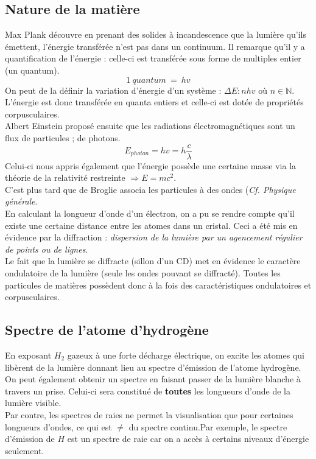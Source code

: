 \documentclass[12pt, a4paper]{article}
\begin{document}
\subsection{Nature de la matière}
Max Plank découvre en prenant des solides à incandescence que la lumière qu'ils émettent, l'énergie transférée n'est pas dans un continuum. Il remarque qu'il y a quantification de l'énergie : celle-ci est transférée sous forme de multiples entier (un quantum).
$$1\ quantum\ =\ hv$$
On peut de la définir la variation d'énergie d'un système : $\Delta E : n h v$ où $n \in \mathbb{N}$. L'énergie est donc transférée en quanta entiers et celle-ci est dotée de propriétés corpusculaires.\\

Albert Einstein proposé ensuite que les radiations électromagnétiques sont un flux de particules ; de photons.
$$E_{photon} = h v = h\frac{c}{\lambda}$$
Celui-ci nous appris également que l'énergie possède une certaine masse via la théorie de la relativité restreinte $\Rightarrow E = mc^2$.\\

C'est plus tard que de Broglie associa les particules à des ondes (\textit{Cf. Physique générale}.\\
En calculant la longueur d'onde d'un électron, on a pu se rendre compte qu'il existe une certaine distance entre les atomes dans un cristal. Ceci a été mis en évidence par la diffraction : \textit{dispersion de la lumière par un agencement régulier de points ou de lignes}.\\

Le fait que la lumière se diffracte (sillon d'un CD) met en évidence le caractère ondulatoire de la lumière (seule les ondes pouvant se diffracté). Toutes les particules de matières possèdent donc à la fois des caractéristiques ondulatoires et corpusculaires.

\subsection{Spectre de l'atome d'hydrogène}
En exposant $H_2$ gazeux à une forte décharge électrique, on excite les atomes qui libèrent de la lumière donnant lieu au spectre d'émission de l'atome hydrogène.
On peut également obtenir un spectre en faisant passer de la lumière blanche à travers un prise. Celui-ci sera constitué de \textbf{toutes} les longueurs d'onde de la lumière visible.\\

Par contre, les spectres de raies ne permet la visualisation que pour certaines longueurs d'ondes, ce qui est $\neq$ du spectre continu.Par exemple, le spectre d'émission de $H$ est un spectre de raie car on a accès à certains niveaux d'énergie seulement.
\end{document}
